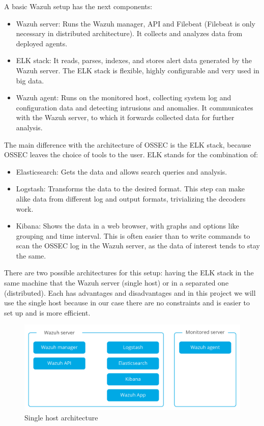 A basic Wazuh setup has the next components\cite{wazuh_architecture}:
\begin{itemize}
	\item Wazuh server: Runs the Wazuh manager, API and Filebeat (Filebeat is only necessary in distributed architecture). It collects and analyzes data from deployed agents.
	\item ELK stack: It reads, parses, indexes, and stores alert data generated by the Wazuh server. The ELK stack is flexible, highly configurable and very used in big data.
	\item Wazuh agent: Runs on the monitored host, collecting system log and configuration data and detecting intrusions and anomalies. It communicates with the Wazuh server, to which it forwards collected data for further analysis.
\end{itemize}
\linej
The main difference with the architecture of OSSEC is the ELK stack, because OSSEC leaves the choice of tools to the user. ELK stands for the combination of:
\begin{itemize}
	\item Elasticsearch: Gets the data and allows search queries and analysis.
	\item Logstash: Transforms the data to the desired format. This step can make alike data from different log and output formats, trivializing the decoders work.
	\item Kibana: Shows the data in a web browser, with graphs and options like grouping and time interval. This is often easier than to write commands to scan the OSSEC log in the Wazuh server, as the data of interest tends to stay the same.
\end{itemize}
\linej
\label{singlehost}
There are two possible architectures for this setup: having the ELK stack in the same machine that the Wazuh server (single host) or in a separated one (distributed). Each has advantages and disadvantages and in this project we will use the single host because in our case there are no constraints and is easier to set up and is more efficient.
\begin{figure}[H]
  \centering
	\includegraphics[width=\textwidth]{figuras/wazuh_singlehost.png}
	\caption{Single host architecture}
\end{figure}

